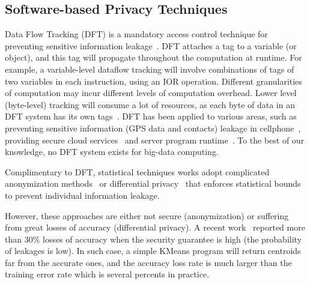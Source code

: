 \vspace{-.15in}\subsection{Software-based Privacy Techniques}
\label{sec:dft}\vspace{-.075in}

Data Flow Tracking (DFT) is a mandatory access control technique for preventing 
sensitive information leakage~\cite{dawn05:taint}. DFT attaches a tag to a 
variable (or object), and this tag will propagate throughout the computation at 
runtime. For example, a variable-level dataflow tracking will involve 
combinations of tags of two variables in each instruction, using an IOR 
operation. Different granularities of computation may incur different levels of 
computation overhead. Lower level (\eg byte-level) tracking will consume a lot 
of resources, as each byte of data in an DFT system has its own 
tags~\cite{libdft:vee12}. DFT has been applied to various areas, such as 
preventing sensitive information 
(\eg GPS data and contacts) leakage in cellphone~\cite{taintdroid:osdi10, 
cleanos:osdi12}, providing secure cloud services~\cite{cloudfence:raid13} and 
server program runtime~\cite{libdft:vee12}. To the best of our knowledge, no 
DFT system exists for big-data computing.
 


Complimentary to DFT, statistical techniques works adopt complicated 
anonymization methods~\cite{kanonymity,icde06:ldiversity} or
differential privacy~\cite{gupt:sigmod12, pinq:sigmod09,airavat:nsdi10} that 
enforces statistical
bounds to prevent individual information leakage.

However, these approaches are
either not secure (anonymization) or suffering from great losses of accuracy 
(differential privacy).
A recent
work~\cite{differentialresult:vldb15} reported more than 30\% losses of accuracy 
when the security
guarantee is high (the probability of leakages is low). In such case, a simple 
KMeans program
will return centroids far from the accurate ones, and the accuracy loss rate is
much larger than the training error rate which is several percents in practice.

